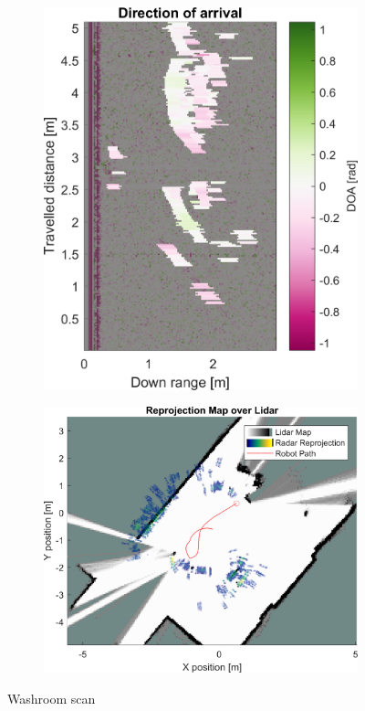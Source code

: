 \begin{figure}[htbp]
\begin{subfigure}[t]{0.475\linewidth}
        \includegraphics[width=\linewidth,max height=.475\textheight]{gfx/results/washroom_doa.png}
    \end{subfigure}%
    \hfill%
    \begin{subfigure}[t]{0.475\linewidth}
        \centering
        \includegraphics[width=\linewidth,max height=.475\textheight]{gfx/results/washroom_map.png}
    \end{subfigure}%
    \caption{Washroom scan}
\end{figure}


